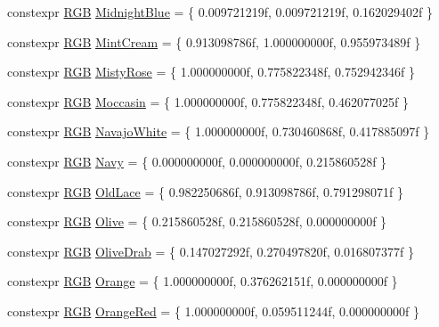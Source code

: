 \begin{DoxyCompactItemize}
\item 
constexpr \hyperlink{structmage_1_1_r_g_b}{R\+GB} \hyperlink{namespacemage_1_1color_a973485679cfd59ce6ca47a4f96104a62}{Midnight\+Blue} = \{ 0.\+009721219f, 0.\+009721219f, 0.\+162029402f \}
\item 
constexpr \hyperlink{structmage_1_1_r_g_b}{R\+GB} \hyperlink{namespacemage_1_1color_a545b07f3dbe9d887c33cd6575123d88d}{Mint\+Cream} = \{ 0.\+913098786f, 1.\+000000000f, 0.\+955973489f \}
\item 
constexpr \hyperlink{structmage_1_1_r_g_b}{R\+GB} \hyperlink{namespacemage_1_1color_accc070278e15b17924142ac2cf2ffa7e}{Misty\+Rose} = \{ 1.\+000000000f, 0.\+775822348f, 0.\+752942346f \}
\item 
constexpr \hyperlink{structmage_1_1_r_g_b}{R\+GB} \hyperlink{namespacemage_1_1color_ade191f43672b1ee280fbd53fed9d5558}{Moccasin} = \{ 1.\+000000000f, 0.\+775822348f, 0.\+462077025f \}
\item 
constexpr \hyperlink{structmage_1_1_r_g_b}{R\+GB} \hyperlink{namespacemage_1_1color_a900d3e18327610b3a28909a4e2e0f28a}{Navajo\+White} = \{ 1.\+000000000f, 0.\+730460868f, 0.\+417885097f \}
\item 
constexpr \hyperlink{structmage_1_1_r_g_b}{R\+GB} \hyperlink{namespacemage_1_1color_a61827d5a9d3b434155ba49592e474222}{Navy} = \{ 0.\+000000000f, 0.\+000000000f, 0.\+215860528f \}
\item 
constexpr \hyperlink{structmage_1_1_r_g_b}{R\+GB} \hyperlink{namespacemage_1_1color_a7c9fc63a81fb81315a77b6a031a5309f}{Old\+Lace} = \{ 0.\+982250686f, 0.\+913098786f, 0.\+791298071f \}
\item 
constexpr \hyperlink{structmage_1_1_r_g_b}{R\+GB} \hyperlink{namespacemage_1_1color_a7e1414ce4e2b7db430d55135da40fe57}{Olive} = \{ 0.\+215860528f, 0.\+215860528f, 0.\+000000000f \}
\item 
constexpr \hyperlink{structmage_1_1_r_g_b}{R\+GB} \hyperlink{namespacemage_1_1color_af64e33355edbb29b2b6200bc3a4dbe17}{Olive\+Drab} = \{ 0.\+147027292f, 0.\+270497820f, 0.\+016807377f \}
\item 
constexpr \hyperlink{structmage_1_1_r_g_b}{R\+GB} \hyperlink{namespacemage_1_1color_ac29b4832f097eea80e4a07c4b4075ce6}{Orange} = \{ 1.\+000000000f, 0.\+376262151f, 0.\+000000000f \}
\item 
constexpr \hyperlink{structmage_1_1_r_g_b}{R\+GB} \hyperlink{namespacemage_1_1color_a7aa807153f37477c187dac3d059b7f83}{Orange\+Red} = \{ 1.\+000000000f, 0.\+059511244f, 0.\+000000000f \}
\item 

\end{DoxyCompactItemize}
